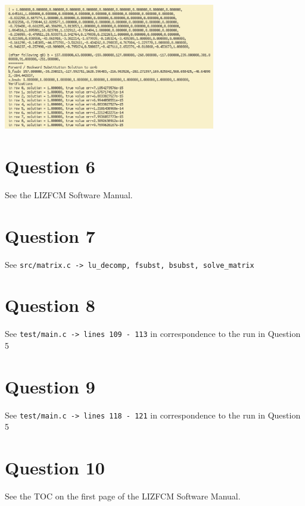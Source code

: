 \documentclass[11pt]{article}
\begin{document}
\begin{center}
\includegraphics[width=350px]{./img/test_routine_2.png}
\end{center}

\section{Question 6}
\label{sec:orgee1884d}
See the LIZFCM Software Manual.

\section{Question 7}
\label{sec:org6f86e09}
See \texttt{src/matrix.c -> lu\_decomp, fsubst, bsubst, solve\_matrix}

\section{Question 8}
\label{sec:orga79c31e}
See \texttt{test/main.c -> lines 109 - 113} in correspondence to the run in Question 5

\section{Question 9}
\label{sec:org5b1b74d}
See \texttt{test/main.c -> lines 118 - 121} in correspondence to the run in Question 5

\section{Question 10}
\label{sec:org7409683}
See the TOC on the first page of the LIZFCM Software Manual.
\end{document}
